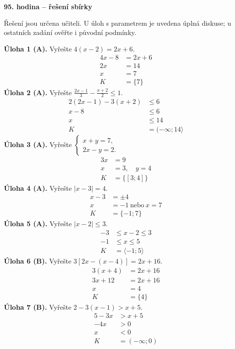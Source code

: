 \documentclass[11pt,a4paper]{article}
\begin{document}
\begin{center}\Large\bfseries 95. hodina -- řešení sbírky\end{center}
\small Řešení jsou určena učiteli. U úloh s parametrem je uvedena úplná diskuse; u ostatních zadání ověřte i původní podmínky.\normalsize\par\medskip
\noindent\textbf{Úloha 1 (A).} Vyřešte $4(x-2)=2x+6$.
\[\begin{aligned}
4x-8&=2x+6 \\
2x&=14 \\
x&=7 \\
K&=\{7\}
\end{aligned}\]
\noindent\textbf{Úloha 2 (A).} Vyřešte $\frac{2x-1}{3}-\frac{x+2}{2}\le1$.
\[\begin{aligned}
2(2x-1)-3(x+2)&\le6 \\
x-8&\le6 \\
x&\le14 \\
K&=(-\infty;14\rangle
\end{aligned}\]
\noindent\textbf{Úloha 3 (A).} Vyřešte $\begin{cases}x+y=7,\\2x-y=2.\end{cases}$
\[\begin{aligned}
3x&=9 \\
x&=3,\quad y=4 \\
K&=\{[3;4]\}
\end{aligned}\]
\noindent\textbf{Úloha 4 (A).} Vyřešte $|x-3|=4$.
\[\begin{aligned}
x-3&=\pm4 \\
x&=-1\ \text{nebo}\ x=7 \\
K&=\{-1;7\}
\end{aligned}\]
\noindent\textbf{Úloha 5 (A).} Vyřešte $|x-2|\le3$.
\[\begin{aligned}
-3&\le x-2\le3 \\
-1&\le x\le5 \\
K&=\langle-1;5\rangle
\end{aligned}\]
\noindent\textbf{Úloha 6 (B).} Vyřešte $3[2x-(x-4)]=2x+16$.
\[\begin{aligned}
3(x+4)&=2x+16 \\
3x+12&=2x+16 \\
x&=4 \\
K&=\{4\}
\end{aligned}\]
\noindent\textbf{Úloha 7 (B).} Vyřešte $2-3(x-1)>x+5$.
\[\begin{aligned}
5-3x&>x+5 \\
-4x&>0 \\
x&<0 \\
K&=(-\infty;0)
\end{aligned}\]
\end{document}
